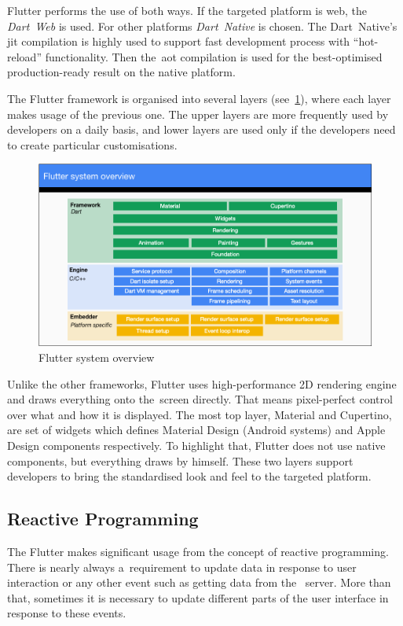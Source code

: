 Flutter performs the use of both ways. If the targeted platform is web, the \textit{Dart~Web} is used. For other platforms \textit{Dart~Native} is chosen. The Dart~Native's \gls{jit} compilation is highly used to support fast development process with ``hot-reload'' functionality. Then the~\gls{aot} compilation is used for the best-optimised production-ready result on the native platform.  

The Flutter framework is organised into several layers (see~\cref{fig:flutter-layer-cake}), where each layer makes usage of the previous one. The upper layers are more frequently used by developers on a daily basis, and lower layers are used only if the developers need to create particular customisations. 

\begin{figure}[htp]
    \centering
    \includegraphics[width=0.8\linewidth]{img/flutter/flutter-layer-cake.png}
    \caption{Flutter system overview~\cite{flutter-technical-overview}}
    \label{fig:flutter-layer-cake}
\end{figure}

Unlike the other frameworks, Flutter uses high-performance 2D rendering engine and draws everything onto the~screen directly. That means pixel-perfect control over what and how it is displayed. The most top layer, Material and Cupertino, are set of widgets which defines Material Design (Android systems) and Apple Design components respectively. To highlight that, Flutter does not use native components, but everything draws by himself. These two layers support developers to bring the standardised look and feel to the targeted platform.
\subsection{Reactive Programming}
The Flutter makes significant usage from the concept of reactive programming. There is nearly always a~requirement to update data in response to user interaction or any other event such as getting data from the~ server. More than that, sometimes it is necessary to update different parts of the user interface in response to these events. 

